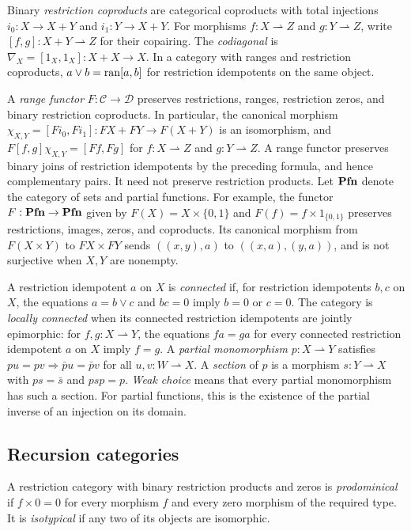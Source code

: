 Binary \emph{restriction coproducts} are categorical coproducts with
total injections $i_0:X\to X+Y$ and $i_1:Y\to X+Y$.
For morphisms $f:X\rightharpoonup Z$ and $g:Y\rightharpoonup Z$,
write $[f,g]:X+Y\rightharpoonup Z$ for their copairing.
The \emph{codiagonal} is
$\nabla_X=[1_X,1_X]:X+X\to X$.
In a category with ranges and restriction coproducts,
$a\vee b=\operatorname{ran}[a,b]$ for restriction idempotents on the same object.

A \emph{range functor} $F:\mathcal C\to\mathcal D$ preserves
restrictions, ranges, restriction zeros, and binary
restriction coproducts. In particular, the canonical morphism
$\chi_{X,Y}=[F i_0,F i_1]:FX+FY\to F(X+Y)$
is an isomorphism, and
$F[f,g]\chi_{X,Y}=[Ff,Fg]$ for $f:X\rightharpoonup Z$ and
$g:Y\rightharpoonup Z$. A range functor preserves binary
joins of restriction idempotents by the preceding formula, and hence
complementary pairs.
It need not preserve restriction products. Let $\mathbf{Pfn}$ denote the
category of sets and partial functions. For example, the functor
$F:\mathbf{Pfn}\to\mathbf{Pfn}$ given by $F(X)=X\times\{0,1\}$ and
$F(f)=f\times1_{\{0,1\}}$ preserves restrictions, images, zeros,
and coproducts. Its canonical morphism from $F(X\times Y)$ to
$FX\times FY$ sends $((x,y),a)$ to $((x,a),(y,a))$, and is
not surjective when $X,Y$ are nonempty.

A restriction idempotent $a$ on $X$ is \emph{connected} if, for
restriction idempotents $b,c$ on $X$, the equations $a=b\vee c$ and
$bc=0$ imply $b=0$ or $c=0$. The category is \emph{locally connected}
when its connected restriction idempotents are jointly epimorphic: for
$f,g:X\rightharpoonup Y$, the equations $fa=ga$ for every connected
restriction idempotent $a$ on $X$ imply $f=g$.
A \emph{partial monomorphism} $p:X\rightharpoonup Y$ satisfies
$pu=pv\Rightarrow\bar p u=\bar p v$ for all
$u,v:W\rightharpoonup X$.
A \emph{section} of $p$ is a morphism $s:Y\rightharpoonup X$
with $ps=\bar s$ and $psp=p$.
\emph{Weak choice} means that every partial monomorphism has such
a section. For partial functions, this is the existence of the
partial inverse of an injection on its domain.

\subsection{Recursion categories}

A restriction category with binary restriction products and zeros is
\emph{prodominical} if $f\times0=0$ for every morphism $f$ and every
zero morphism of the required type. It is \emph{isotypical} if any
two of its objects are isomorphic.

